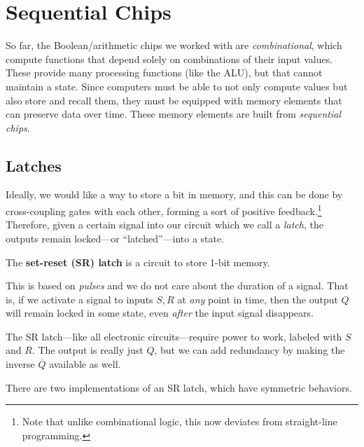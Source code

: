 \section{Sequential Chips}

  So far, the Boolean/arithmetic chips we worked with are \textit{combinational}, which compute functions that depend solely on combinations of their input values.  These provide many processing functions (like the ALU), but that cannot maintain a state. Since computers must be able to not only compute values but also store and recall them, they must be equipped with memory elements that can preserve data over time. These memory elements are built from \textit{sequential chips}. 

\subsection{Latches}

  Ideally, we would like a way to store a bit in memory, and this can be done by cross-coupling gates with each other, forming a sort of positive feedback.\footnote{Note that unlike combinational logic, this now deviates from straight-line programming.} Therefore, given a certain signal into our circuit which we call a \textit{latch}, the outputs remain locked---or ``latched''---into a state. 

  \begin{definition}[SR Latch]
    The \textbf{set-reset (SR) latch} is a circuit to store 1-bit memory. 

    This is based on \textit{pulses} and we do not care about the duration of a signal. That is, if we activate a signal to inputs $S, R$ at \textit{any} point in time, then the output $Q$ will remain locked in some state, even \textit{after} the input signal disappears. 

    The SR latch---like all electronic circuits---require power to work, labeled with $S$ and $R$. The output is really just $Q$, but we can add redundancy by making the inverse $\overline{Q}$ available as well. 
  \end{definition}

  There are two implementations of an SR latch, which have symmetric behaviors. 


